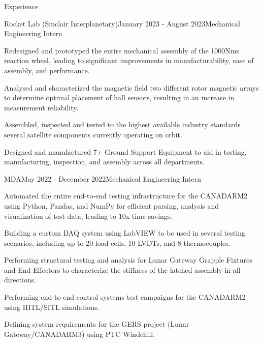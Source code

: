 \documentclass{resume} %
\newenvironment{CVmode}{}{}
\begin{document}
\begin{rSection}{Experience}

\begin{rSubsection}{Rocket Lab (Sinclair Interplanetary)}{January 2023 - August 2023}{Mechanical Engineering Intern}{}

\item Redesigned and prototyped the entire mechanical assembly of the 1000Nms reaction wheel, leading to significant improvements in manufacturability, ease of assembly, and performance.
\item Analysed and characterized the magnetic field two different rotor magnetic arrays to determine optimal placement of hall sensors, resulting in an increase in measurement reliability.
\item Assembled, inspected and tested to the highest available industry standards several satellite components currently operating on orbit.
\item Designed and manufactured 7+ Ground Support Equipment to aid in testing, manufacturing, inspection, and assembly across all departments.

\end{rSubsection}

\begin{rSubsection}{MDA}{May 2022 - December 2022}{Mechanical Engineering Intern}{}

\item Automated the entire end-to-end testing infrastructure for the CANADARM2 using Python, Pandas, and NumPy for efficient parsing, analysis and visualization of test data, leading to 10x time savings.
\item Building a custom DAQ system using LabVIEW to be used in several testing scenarios, including up to 20 load cells, 10 LVDTs, and 8 thermocouples.
\item Performing structural testing and analysis for Lunar Gateway Grapple Fixtures and End Effectors to characterize the stiffness of the latched assembly in all directions.
\item Performing end-to-end control systems test campaigns for the CANADARM2 using HITL/SITL simulations.
\item Defining system requirements for the GERS project (Lunar Gateway/CANADARM3) using PTC Windchill.

\end{rSubsection}

\begin{CVmode}


\end{CVmode}
\end{rSection}
\end{document}
